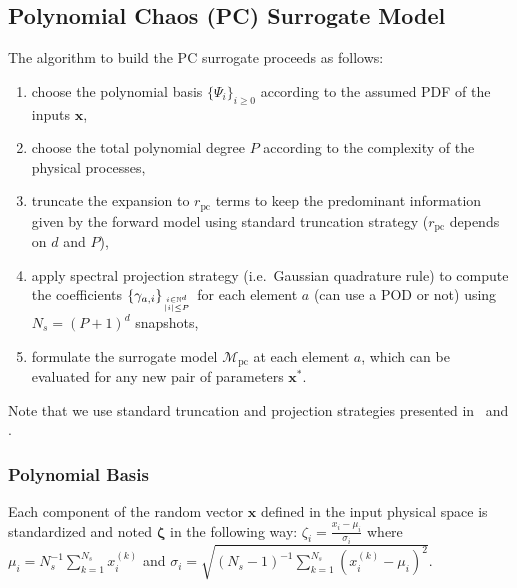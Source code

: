 \subsection{Polynomial Chaos (PC) Surrogate Model}\label{sec:PC}

The algorithm to build the PC surrogate proceeds as follows:
\begin{enumerate}
\item choose the polynomial basis $\lbrace\Psi_{i}\rbrace_{i\geq 0}$ according to the assumed PDF of the inputs $\mathbf{x}$,
\item choose the total polynomial degree $P$ according to the complexity of the physical processes,
\item truncate the expansion to $r_{\text{pc}}$ terms to keep the predominant information given by the forward model using standard truncation strategy ($r_{\text{pc}}$ depends on $d$ and $P$),
\item apply spectral projection strategy (i.e.~Gaussian quadrature rule) to compute the coefficients $\lbrace\gamma_{a,i}\rbrace_{i\in\mathbb{N}^d\atop|i|\leq P}$ for each element $a$ (can use a POD or not) using $N_{s} = (P+1)^{d}$ snapshots,
\item formulate the surrogate model $\mathcal{M}_{\text{pc}}$ at each element $a$, which can be evaluated for any new pair of parameters $\mathbf{x}^*$.
\end{enumerate}
Note that we use standard truncation and projection strategies presented in~\cite{lemaitreknio2010} and \cite{xiu2010}.

\subsubsection{Polynomial Basis}

Each component of the random vector $\mathbf{x}$ defined in the input physical space is standardized and noted $\boldsymbol{\zeta}$ in the following way: $\zeta_i=\frac{x_i-\mu_i}{\sigma_i}$ where $\mu_i=N_{s}^{-1}\sum_{k=1}^{N_{s}}x_i^{(k)}$ and $\sigma_i=\sqrt{(N_{s}-1)^{-1}\sum_{k=1}^{N_{s}}\left(x_i^{(k)}-\mu_i\right)^2}$. 


